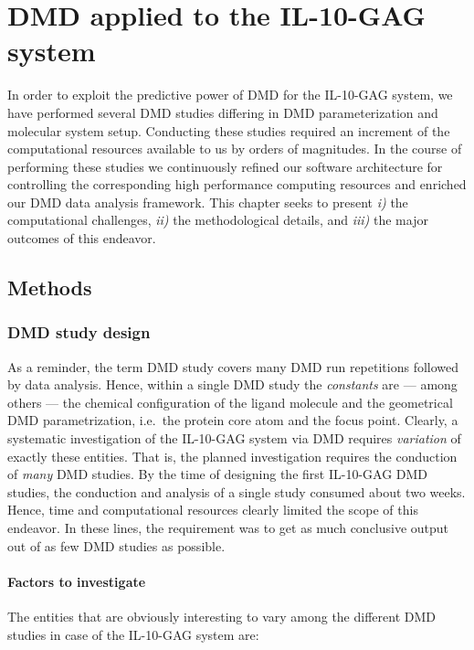 \chapter{DMD applied to the IL-10-GAG system}

In order to exploit the predictive power of DMD for the IL-10-GAG system, we
have performed several DMD studies differing in DMD parameterization and
molecular system setup. Conducting these studies required an increment of the
computational resources available to us by orders of magnitudes. In the course
of performing these studies we continuously refined our software architecture
for controlling the corresponding high performance computing resources and
enriched our DMD data analysis framework. This chapter seeks to present
\textit{i)} the computational challenges, \textit{ii)} the methodological
details, and \textit{iii)} the major outcomes of this endeavor.


\section{Methods}

\subsection{DMD study design}

As a reminder, the term DMD study covers many DMD run repetitions followed by
data analysis. Hence, within a single DMD study the \textit{constants} are ---
among others --- the chemical configuration of the ligand molecule and the
geometrical DMD parametrization, i.e.\ the protein core atom and the focus
point. Clearly, a systematic investigation of the IL-10-GAG system via DMD
requires \textit{variation} of exactly these entities. That is, the planned
investigation requires the conduction of \textit{many} DMD studies. By the time
of designing the first IL-10-GAG DMD studies, the conduction and analysis of a
single study consumed about two weeks. Hence, time and computational resources
clearly limited the scope of this endeavor. In these lines, the requirement was
to get as much conclusive output out of as few DMD studies as possible.

\subsubsection{Factors to investigate}

The entities that are obviously interesting to vary among the different DMD
studies in case of the IL-10-GAG system are:

